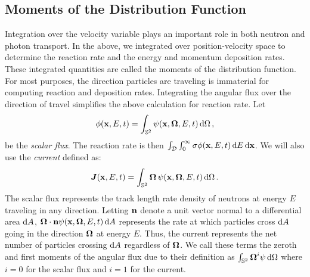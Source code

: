\documentclass[../doc.tex]{subfiles}
\begin{document}
\subsection{Moments of the Distribution Function}
Integration over the velocity variable plays an important role in both neutron and photon transport. In the above, we integrated over position-velocity space to determine the reaction rate and the energy and momentum deposition rates. These integrated quantities are called the moments of the distribution function. 
For most purposes, the direction particles are traveling is immaterial for computing reaction and deposition rates. Integrating the angular flux over the direction of travel simplifies the above calculation for reaction rate. Let 
	\begin{equation}
		\phi(\boldsymbol{\mathrm{x}},E,t) = \int_{\mathbb{S}^2} \psi(\boldsymbol{\mathrm{x}},\boldsymbol{\Omega},E,t) \mathop{}\!\mathrm{d} \Omega \,,  
	\end{equation}
be the \emph{scalar flux}. The reaction rate is then $\int_{\mathcal{D}} \int_0^\infty \sigma \phi(\boldsymbol{\mathrm{x}},E,t) \mathop{}\!\mathrm{d} E \mathop{}\!\mathrm{d} \boldsymbol{\mathrm{x}}$. We will also use the \emph{current} defined as: 
	\begin{equation}
		\boldsymbol{J}(\boldsymbol{\mathrm{x}},E,t) = \int_{\mathbb{S}^2} \boldsymbol{\Omega}\,\psi(\boldsymbol{\mathrm{x}},\boldsymbol{\Omega},E,t) \mathop{}\!\mathrm{d} \Omega \,. 
	\end{equation}
The scalar flux represents the track length rate density of neutrons at energy $E$ traveling in any direction. Letting $\boldsymbol{\mathrm{n}}$ denote a unit vector normal to a differential area $\mathop{}\!\mathrm{d} A$, $\boldsymbol{\Omega}\cdot\boldsymbol{\mathrm{n}} \psi(\boldsymbol{\mathrm{x}},\boldsymbol{\Omega},E,t) \mathop{}\!\mathrm{d} A$ represents the rate at which particles cross $\mathop{}\!\mathrm{d} A$ going in the direction $\boldsymbol{\Omega}$ at energy $E$. Thus, the current represents the net number of particles crossing $\mathop{}\!\mathrm{d} A$ regardless of $\boldsymbol{\Omega}$. We call these terms the zeroth and first moments of the angular flux due to their definition as $\int_{\mathbb{S}^2} \boldsymbol{\Omega}^i \psi \mathop{}\!\mathrm{d} \Omega$ where $i=0$ for the scalar flux and $i=1$ for the current. 
\end{document}
